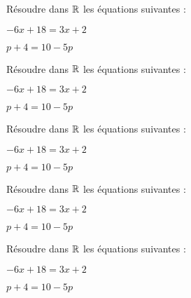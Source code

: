 \documentclass{exos}
\begin{document}
\begin{exercize*}
Résoudre dans $\mathbb{R}$ les équations suivantes :
\begin{alphaquestions}
\item $-6x + 18 = 3x + 2$  
\item $p + 4 = 10 - 5p$  
\end{alphaquestions}
\end{exercize*}
\vspace*{2cm}
\begin{exercize*}
Résoudre dans $\mathbb{R}$ les équations suivantes :
\begin{alphaquestions}
\item $-6x + 18 = 3x + 2$  
\item $p + 4 = 10 - 5p$  
\end{alphaquestions}
\end{exercize*}
\vspace*{2cm}
\begin{exercize*}
Résoudre dans $\mathbb{R}$ les équations suivantes :
\begin{alphaquestions}
\item $-6x + 18 = 3x + 2$  
\item $p + 4 = 10 - 5p$  
\end{alphaquestions}
\end{exercize*}
\vspace*{2cm}
\begin{exercize*}
Résoudre dans $\mathbb{R}$ les équations suivantes :
\begin{alphaquestions}
\item $-6x + 18 = 3x + 2$  
\item $p + 4 = 10 - 5p$  
\end{alphaquestions}
\end{exercize*}
\vspace*{2cm}
\begin{exercize*}
Résoudre dans $\mathbb{R}$ les équations suivantes :
\begin{alphaquestions}
\item $-6x + 18 = 3x + 2$  
\item $p + 4 = 10 - 5p$  
\end{alphaquestions}
\end{exercize*}
\end{document}
